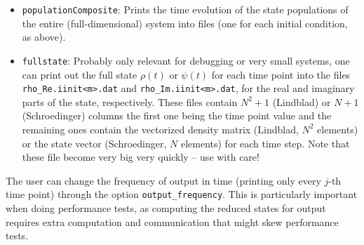 \documentclass[11pt]{article}
\begin{document}
\begin{itemize}
  \item \texttt{populationComposite}: Prints the time evolution of the state populations of the entire (full-dimensional) system into files (one for each initial condition, as above). 
  \item \texttt{fullstate}: Probably only relevant for debugging or very small systems, one can print out the full state $\rho(t)$ or $\psi(t)$ for each time point into the files \texttt{rho\_Re.iinit<m>.dat} and \texttt{rho\_Im.iinit<m>.dat}, for the real and imaginary parts of the state, respectively. These files contain $N^2 +1$ (Lindblad) or $N+1$ (Schroedinger) columns the first one being the time point value and the remaining ones contain the vectorized density matrix (Lindblad, $N^2$ elements) or the state vector (Schroedinger, $N$ elements) for each time step. Note that these file become very big very quickly -- use with care!
\end{itemize}

The user can change the frequency of output in time (printing only every $j$-th time point) through the option \texttt{output\_frequency}. This is particularly important when doing performance tests, as computing the reduced states for output requires extra computation and communication that might skew performance tests. 
\end{document}
